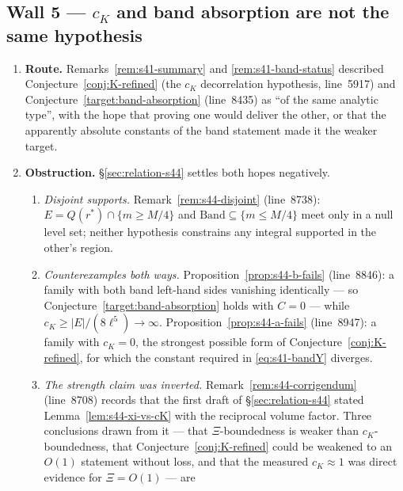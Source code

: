 \documentclass[11pt]{article}
\theoremstyle{definition}
\theoremstyle{remark}
\begin{document}
\subsection{Wall 5 --- \texorpdfstring{$c_K$}{c\_K} and band absorption are
  not the same hypothesis}
\label{subsec:wall5-independence}

\begin{enumerate}[label=(\alph*),leftmargin=2.2em]
  \item \textbf{Route.} Remarks~\ref{rem:s41-summary} and
    \ref{rem:s41-band-status} described
    Conjecture~\ref{conj:K-refined} (the $c_K$ decorrelation hypothesis,
    line~5917) and Conjecture~\ref{target:band-absorption} (line~8435) as
    ``of the same analytic type'', with the hope that proving one would
    deliver the other, or that the apparently absolute constants of the band
    statement made it the weaker target.
  \item \textbf{Obstruction.} \S\ref{sec:relation-s44} settles both hopes
    negatively.
    \begin{enumerate}[label=\textup{(\roman*)},leftmargin=2.6em]
      \item \emph{Disjoint supports.} Remark~\ref{rem:s44-disjoint}
        (line~8738): $E=Q(r^*)\cap\{m\geq M/4\}$ and
        $\mathrm{Band}\subseteq\{m\leq M/4\}$ meet only in a null level set;
        neither hypothesis constrains any integral supported in the other's
        region.
      \item \emph{Counterexamples both ways.}
        Proposition~\ref{prop:s44-b-fails} (line~8846): a family with both
        band left-hand sides vanishing identically --- so
        Conjecture~\ref{target:band-absorption} holds with $C=0$ --- while
        $c_K\geq|E|/(8\ell^5)\to\infty$.
        Proposition~\ref{prop:s44-a-fails} (line~8947): a family with
        $c_K=0$, the strongest possible form of
        Conjecture~\ref{conj:K-refined}, for which the constant required in
        \eqref{eq:s41-bandY} diverges.
      \item \emph{The strength claim was inverted.}
        Remark~\ref{rem:s44-corrigendum} (line~8708) records that the first
        draft of \S\ref{sec:relation-s44} stated
        Lemma~\ref{lem:s44-xi-vs-cK} with the reciprocal volume factor. Three
        conclusions drawn from it --- that $\Xi$-boundedness is weaker than
        $c_K$-boundedness, that Conjecture~\ref{conj:K-refined} could be
        weakened to an $O(1)$ statement without loss, and that the measured
        $c_K\approx1$ was direct evidence for $\Xi=O(1)$ --- are

\end{enumerate}
\end{enumerate}
\end{document}
